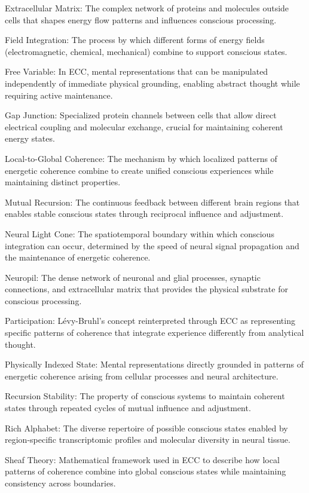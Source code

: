 Extracellular Matrix: The complex network of proteins and molecules outside cells that shapes energy flow patterns and influences conscious processing.

Field Integration: The process by which different forms of energy fields (electromagnetic, chemical, mechanical) combine to support conscious states.

Free Variable: In ECC, mental representations that can be manipulated independently of immediate physical grounding, enabling abstract thought while requiring active maintenance.

Gap Junction: Specialized protein channels between cells that allow direct electrical coupling and molecular exchange, crucial for maintaining coherent energy states.

Local-to-Global Coherence: The mechanism by which localized patterns of energetic coherence combine to create unified conscious experiences while maintaining distinct properties.

Mutual Recursion: The continuous feedback between different brain regions that enables stable conscious states through reciprocal influence and adjustment.

Neural Light Cone: The spatiotemporal boundary within which conscious integration can occur, determined by the speed of neural signal propagation and the maintenance of energetic coherence.

Neuropil: The dense network of neuronal and glial processes, synaptic connections, and extracellular matrix that provides the physical substrate for conscious processing.

Participation: Lévy-Bruhl's concept reinterpreted through ECC as representing specific patterns of coherence that integrate experience differently from analytical thought.

Physically Indexed State: Mental representations directly grounded in patterns of energetic coherence arising from cellular processes and neural architecture.

Recursion Stability: The property of conscious systems to maintain coherent states through repeated cycles of mutual influence and adjustment.

Rich Alphabet: The diverse repertoire of possible conscious states enabled by region-specific transcriptomic profiles and molecular diversity in neural tissue.

Sheaf Theory: Mathematical framework used in ECC to describe how local patterns of coherence combine into global conscious states while maintaining consistency across boundaries.

